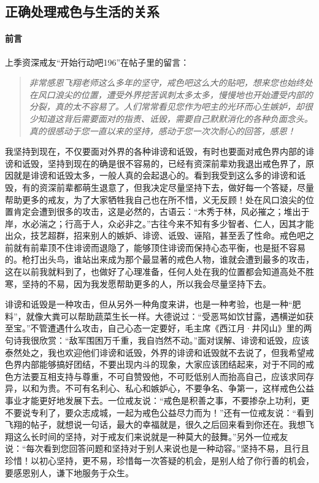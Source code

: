 \subsection{正确处理戒色与生活的关系}

\paragraph{前言}

上季资深戒友“开始行动吧196”在帖子里的留言：

\begin{quote}\it
    非常感恩飞翔老师这么多年的坚守，戒色吧这么大的贴吧，想来您也始终处在风口浪尖的位置，遭受外界挖苦讽刺太多太多，慢慢地也开始遭受内部的分裂，真的太不容易了。人们常常看见您作为吧主的光环而心生嫉妒，却很少知道这背后需要面对的指责、诋毁，需要自己默默消化的各种负面念头。真的很感动于您一直以来的坚持，感动于您一次次耐心的回答，感恩！
\end{quote}

我坚持到现在，不仅要面对外界的各种诽谤和诋毁，有时也要面对戒色界内部的诽谤和诋毁，坚持到现在的确是很不容易的，已经有资深前辈劝我退出戒色界了，原因就是诽谤和诋毁太多，一般人真的会起退心的。看到我受到这么多的诽谤和诋毁，有的资深前辈都萌生退意了，但我决定尽量坚持下去，做好每一个答疑，尽量帮助更多的戒友，为了大家牺牲我自己也在所不惜，义无反顾！处在风口浪尖的位置肯定会遭到很多的攻击，这是必然的，古语云：“木秀于林，风必摧之；堆出于岸，水必湍之；行高于人，众必非之。”古往今来不知有多少智者、仁人，因其才能出众，技艺超群，招来别人的嫉妒、诽谤、诋毁、诬陷，甚至丢了性命。戒色吧之前就有前辈顶不住诽谤而退隐了，能够顶住诽谤而保持心态平衡，也是挺不容易的。枪打出头鸟，谁站出来成为那个最显著的戒色人物，谁就会遭到最多的攻击，这在以前我就料到了，也做好了心理准备，任何人处在我的位置都会知道高处不胜寒，坚持的不易，因为我发愿帮助更多的人，所以我会尽量坚持下去。

诽谤和诋毁是一种攻击，但从另外一种角度来讲，也是一种考验，也是一种“肥料”，就像大粪可以帮助蔬菜生长一样。大德说过：“受恶骂如饮甘露，遇横逆如获至宝。”不管遭遇什么攻击，自己心态一定要好，毛主席《西江月·井冈山》里的两句诗我很欣赏：“敌军围困万千重，我自岿然不动。”面对误解、诽谤和诋毁，应该泰然处之，我也欢迎他们诽谤和诋毁，外界的诽谤和诋毁就不去说了，但我希望戒色界内部能够搞好团结，不要出现内斗的现象，大家应该团结起来，对于不同的戒色方法要互相支持与尊重，不可自赞毁他，不可贬低别人而抬高自己，应该求同存异，以和为贵。不可有名利心、私心和嫉妒心，不要争名、争第一，这样戒色公益事业才能更好地发展下去。一位戒友说：“戒色是积善之事，不要掺杂上功利，更不要说专利了，要众志成城，一起为戒色公益尽力而为！”还有一位戒友说：“看到飞翔的帖子，就想说一句话，最大的幸福就是，很久之后回来看到你还在。我想飞翔这么长时间的坚持，对于戒友们来说就是一种莫大的鼓舞。”另外一位戒友说：“每次看到您回答问题和坚持对于别人来说也是一种动容。”坚持不易，且行且珍惜！以初心坚持，更不易，珍惜每一次答疑的机会，是别人给了你行善的机会，要感恩别人，谦下地服务于众生。


